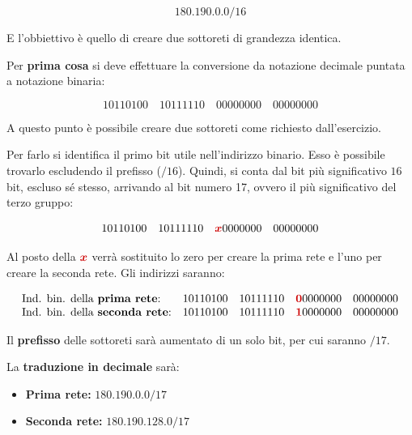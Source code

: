 \documentclass[a4paper]{article}
\newcommand{\binaryaddress}[4]{#1 \hspace{1em} #2 \hspace{1em} #3 \hspace{1em} #4}
\begin{document}
	\begin{equation*}
		180.190.0.0/16
	\end{equation*}

	\noindent
	E l'obbiettivo è quello di creare due sottoreti di grandezza identica.\newline
	
	\noindent
	Per \textbf{prima cosa} si deve effettuare la conversione da notazione decimale puntata a notazione binaria:
	
	\begin{equation*}
		\binaryaddress{10110100}{10111110}{00000000}{00000000}
	\end{equation*}

	\noindent
	A questo punto è possibile creare due sottoreti come richiesto dall’esercizio.\newline
	
	\noindent
	Per farlo si identifica il primo bit utile nell'indirizzo binario. Esso è possibile trovarlo escludendo il prefisso ($/16$). Quindi, si conta dal bit più significativo $16$ bit, escluso sé stesso, arrivando al bit numero 17, ovvero il più significativo del terzo gruppo:
	
	\begin{equation*}
		\binaryaddress{10110100}{10111110}{\textcolor{Red3}{\boldsymbol{x}}0000000}{00000000}
	\end{equation*}

	\noindent
	Al posto della $\textcolor{Red3}{\boldsymbol{x}}$ verrà sostituito lo zero per creare la prima rete e l’uno per creare la seconda rete. Gli indirizzi saranno:
	
	\begin{equation*}
		\begin{array}{ll}
			\text{Ind. bin. della \textbf{prima rete}:} 	& \binaryaddress{10110100}{10111110}{\textcolor{Red3}{\boldsymbol{0}}0000000}{00000000} \\
			\text{Ind. bin. della \textbf{seconda rete}:} 	& \binaryaddress{10110100}{10111110}{\textcolor{Red3}{\boldsymbol{1}}0000000}{00000000}
		\end{array}
	\end{equation*}

	\noindent
	Il \textbf{prefisso} delle sottoreti sarà aumentato di un solo bit, per cui saranno $/17$.\newline
	
	\noindent
	La \textbf{traduzione in decimale} sarà:
	
	\begin{itemize}
		\item \textbf{Prima rete:} $180.190.0.0/17$
		\item \textbf{Seconda rete:} $180.190.128.0/17$
	\end{itemize}
\end{document}
